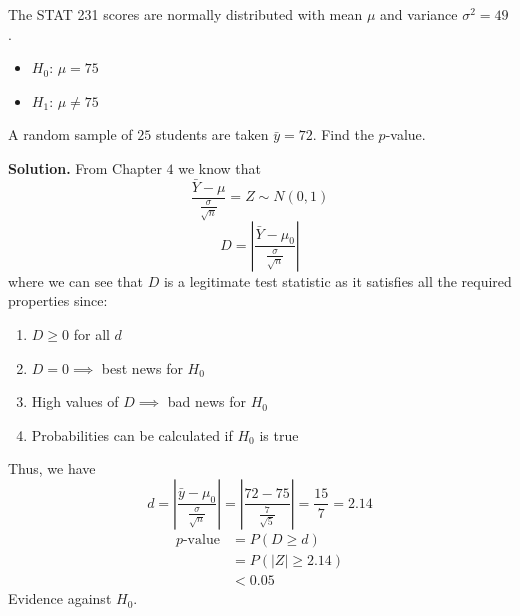 \begin{exbox}
    \begin{example}
        The STAT 231 scores are normally distributed with mean $ \mu $
        and variance $ \sigma^2=49 $.
        \begin{itemize}
            \item $ H_0 $: $ \mu=75 $
            \item $ H_1 $: $ \mu\neq 75 $
        \end{itemize}
        A random sample of $ 25 $ students are taken $ \bar{y}=72 $.
        Find the $ p $-value.

        \textbf{Solution.}
        From Chapter $ 4 $ we know that
        \[ \frac{\bar{Y}-\mu}{\frac{\sigma}{\sqrt{n}}} =Z \sim N(0,1) \]
        \[ D=\left|\frac{\bar{Y}-\mu_0}{\frac{\sigma}{\sqrt{n}}}\right| \]
        where we can see that $ D $ is a legitimate test statistic as
        it satisfies all the required properties since:
        \begin{enumerate}
            \item $ D\geqslant 0 $ for all $ d $
            \item $ D=0\implies $ best news for $ H_0 $
            \item High values of $ D \implies $ bad news for $ H_0 $
            \item Probabilities can be calculated if $ H_0 $ is true
        \end{enumerate}
        Thus, we have
        \[ d=\left|\frac{\bar{y}-\mu_0}{\frac{\sigma}{\sqrt{n}}}\right|=
            \left|\frac{72-75}{\frac{7}{\sqrt{5}}} \right|=\frac{15}{7} =2.14 \]
        \begin{align*}
            p\text{-value}
             & =P(D\geqslant d)      \\
             & =P(|Z|\geqslant 2.14) \\
             & <0.05
        \end{align*}
        Evidence against $ H_0 $.
    \end{example}
\end{exbox}

